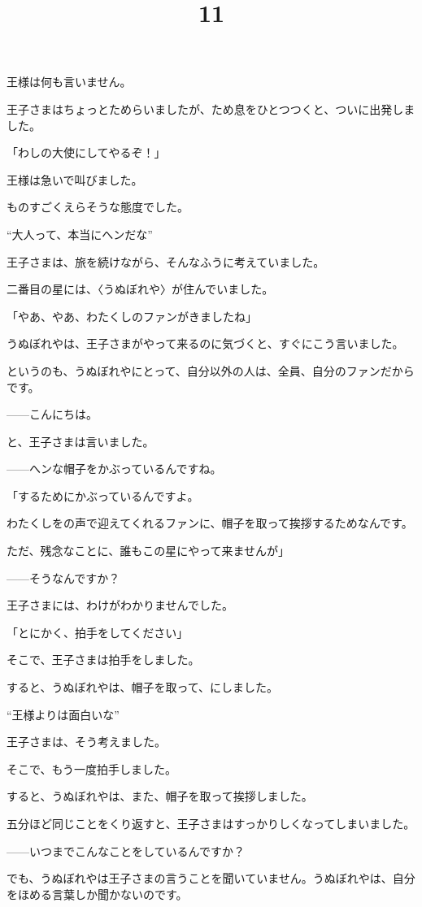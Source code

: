 王様は何も言いません。

王子さまはちょっとためらいましたが、ため息をひとつつくと、ついに出発しました。

「わしの大使にしてやるぞ！」

王様は急いで叫びました。

ものすごくえらそうな態度でした。

“大人って、本当にへンだな”

王子さまは、旅を続けながら、そんなふうに考えていました。

\title{11}

二番目の星には、〈うぬぼれや〉が住んでいました。

「やあ、やあ、わたくしのファンがきましたね」

うぬぼれやは、王子さまがやって来るのに気づくと、すぐにこう言いました。

というのも、うぬぼれやにとって、自分以外の人は、全員、自分のファンだからです。

——こんにちは。

と、王子さまは言いました。

——へンな帽子をかぶっているんですね。

「するためにかぶっているんですよ。


わたくしをの声で迎えてくれるファンに、帽子を取って挨拶するためなんです。

ただ、残念なことに、誰もこの星にやって来ませんが」

——そうなんですか？

王子さまには、わけがわかりませんでした。

「とにかく、拍手をしてください」

そこで、王子さまは拍手をしました。

すると、うぬぼれやは、帽子を取って、にしました。

“王様よりは面白いな”

王子さまは、そう考えました。

そこで、もう一度拍手しました。

すると、うぬぼれやは、また、帽子を取って挨拶しました。

五分ほど同じことをくり返すと、王子さまはすっかりしくなってしまいました。

——いつまでこんなことをしているんですか？

でも、うぬぼれやは王子さまの言うことを聞いていません。うぬぼれやは、自分をほめる言葉しか聞かないのです。

